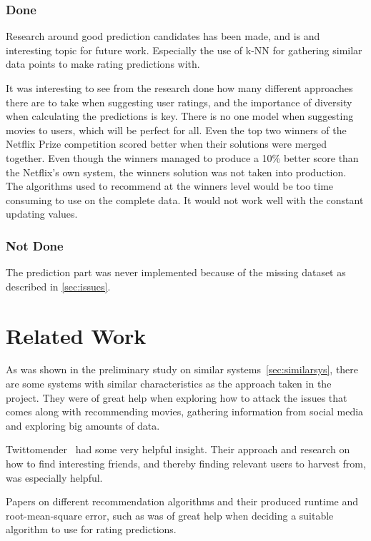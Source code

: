 \subsubsection{Done}
Research around good prediction candidates has been made, and is and interesting topic for future work. Especially the use of k-NN for gathering similar data points to make rating predictions with.

It was interesting to see from the research done how many different approaches there are to take when suggesting user ratings, and the importance of diversity when calculating the predictions is key. There is no one model when suggesting movies to users, which will be perfect for all. Even the top two winners of the Netflix Prize competition scored better when their solutions were merged together. Even though the winners managed to produce a 10\% better score than the Netflix's own system, the winners solution was not taken into production. The algorithms used to recommend at the winners level would be too time consuming to use on the complete data. It would not work well with the constant updating values.

\subsubsection{Not Done}
The prediction part was never implemented because of the missing dataset as described in \ref{sec:issues}.


\section{Related Work}
As was shown in the preliminary study on similar systems~\ref{sec:similarsys}, there are some systems with similar characteristics as the approach taken in the project. They were of great help when exploring how to attack the issues that comes along with recommending movies, gathering information from social media and exploring big amounts of data.

Twittomender~\cite{twittomender} had some very helpful insight. Their approach and research on how to find interesting friends, and thereby finding relevant users to harvest from, was especially helpful.

Papers on different recommendation algorithms and their produced runtime and root-mean-square error, such as \cite{bigchaos-sol,alsMPI,BellKor-CF-TD} was of great help when deciding a suitable algorithm to use for rating predictions.

